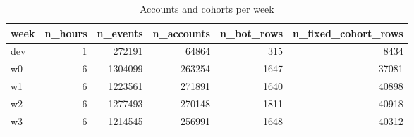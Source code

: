 \begin{table}
\caption{Accounts and cohorts per week}
\label{tab:tab_dataset_overview}
\begin{tabular}{lrrrrr}
\toprule
week & n\_hours & n\_events & n\_accounts & n\_bot\_rows & n\_fixed\_cohort\_rows \\
\midrule
dev & 1 & 272191 & 64864 & 315 & 8434 \\
w0 & 6 & 1304099 & 263254 & 1647 & 37081 \\
w1 & 6 & 1223561 & 271891 & 1640 & 40898 \\
w2 & 6 & 1277493 & 270148 & 1811 & 40918 \\
w3 & 6 & 1214545 & 256991 & 1648 & 40312 \\
\bottomrule
\end{tabular}
\end{table}
